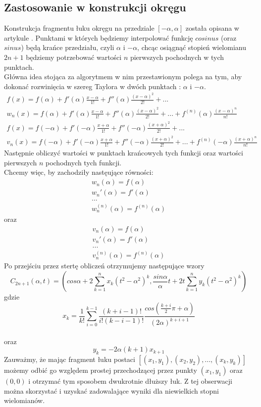 \documentclass[paper=a4, fontsize=11pt]{scrartcl} %
\numberwithin{equation}{section} %
\numberwithin{figure}{section} %
\numberwithin{table}{section} %
\begin{document}
\subsection{Zastosowanie w konstrukcji okręgu}
Konstrukcja fragmentu łuku okręgu na przedziale $[-\alpha, \alpha]$ została opisana w artykule \cite{hermite}. Punktami w których będziemy interpolować funkcję $cosinus$ (oraz $sinus$) będą krańce przedziału, czyli $\alpha$ i $-\alpha$, chcąc osiągnąć stopień wielomianu $2n+1$ będziemy potrzebować wartości $n$ pierwszych pochodnych w tych punktach. \\
Główna idea stojąca za algorytmem w nim przestawionym polega na tym, aby dokonać rozwinięcia w szereg Taylora w dwóch punktach : $\alpha$ i $-\alpha$.
\begin{gather}
f(x) = f(\alpha) + f'(\alpha)\frac{x-\alpha}{1!} + f''(\alpha)\frac{(x-\alpha)^{2}}{2!} + ... \\
w_{n}(x) = f(\alpha) + f'(\alpha)\frac{x-\alpha}{1!} + f''(\alpha)\frac{(x-\alpha)^{2}}{2!} + ... + f^{(n)}(\alpha)\frac{(x-\alpha)^{n}}{n!} \\
f(x) = f(-\alpha) + f'(-\alpha)\frac{x+\alpha}{1!} + f''(-\alpha)\frac{(x+\alpha)^{2}}{2!} + ... \\
v_{n}(x) = f(-\alpha) + f'(-\alpha)\frac{x+\alpha}{1!} + f''(-\alpha)\frac{(x+\alpha)^{2}}{2!} + ... + f^{(n)}(-\alpha)\frac{(x+\alpha)^{n}}{n!}
\end{gather}
Następnie obliczyć wartości w punktach krańcowych tych funkcji oraz wartości pierwszych $n$ pochodnych tych funkcji. \\
Chcemy więc, by zachodziły nastęujące równości:
\begin{gather*}
w_{n}(\alpha) = f(\alpha) \\
w_{n}'(\alpha) = f'(\alpha) \\
...\\
w_{n}^{(n)}(\alpha) = f^{(n)}(\alpha)
\end{gather*}
oraz
\begin{gather*}
v_{n}(\alpha) = f(\alpha) \\
v_{n}'(\alpha) = f'(\alpha) \\
...\\
v_{n}^{(n)}(\alpha) = f^{(n)}(\alpha)
\end{gather*}
Po przejściu przez stertę obliczeń otrzymujemy następujące wzory \\
$$  C_{2n+1}(\alpha, t) = (cos\alpha + 2\sum_{k=1}^{n} x_{k}(t^{2} - \alpha^{2})^{k},  \frac{sin\alpha}{\alpha}t + 2t\sum_{k=1}^{n} y_{k}(t^{2} - \alpha^{2})^{k}) $$ gdzie \\
$$x_{k} = \frac{1}{k!}\sum_{i=0}^{k-1} \frac{(k+i-1)!}{i!(k-i-1)!} \frac{cos(\frac{k+i}{2}\pi + \alpha)}{(2\alpha)^{k+i+1}} $$ \\
oraz $$ y_{k} = -2\alpha(k+1)x_{k+1} $$ \medbreak
Zauważmy, że mając fragment łuku postaci $[(x_{1},y_{1}), (x_{2},y_{2}), ..., (x_{k}, y_{k})]$ możemy odbić go względem prostej przechodzącej przez punkty
$(x_{1},y_{1})$ oraz $(0,0)$ i otrzymać tym sposobem dwukrotnie dłuższy łuk. Z tej obserwacji można skorzystać  i uzyskać zadowalające wyniki dla niewielkich stopni wielomianów.
\end{document}
